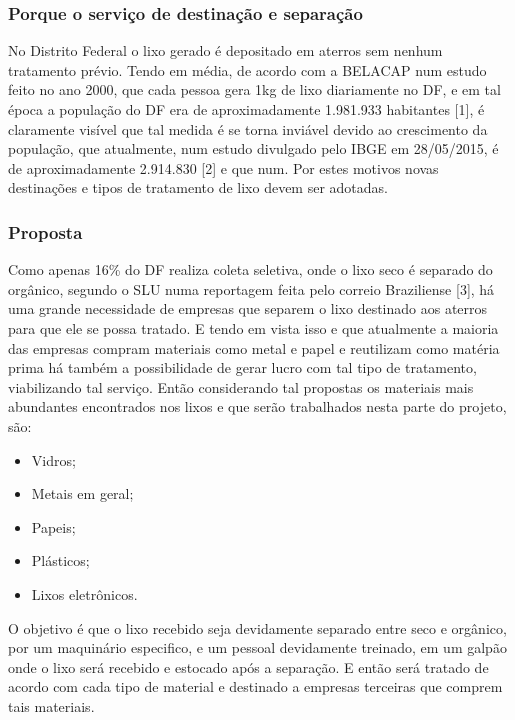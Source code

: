   \subsubsection{Porque o serviço de destinação e separação}

  No Distrito Federal o lixo gerado é depositado em aterros sem nenhum tratamento prévio. Tendo em média, de acordo com a BELACAP num estudo feito no ano 2000, que cada pessoa gera 1kg de lixo diariamente no DF, e em tal época a população do DF era de aproximadamente 1.981.933 habitantes [1], é claramente visível que tal medida é se torna inviável devido ao crescimento da população, que atualmente, num estudo divulgado pelo IBGE em 28/05/2015, é de aproximadamente 2.914.830 [2] e que num. Por estes motivos novas destinações e tipos de tratamento de lixo devem ser adotadas.

  \subsubsection{Proposta}

    Como apenas 16\% do DF realiza coleta seletiva, onde o lixo seco é separado do orgânico, segundo o SLU numa reportagem feita pelo correio Braziliense [3], há uma grande necessidade de empresas que separem o lixo destinado aos aterros para que ele se possa tratado. E tendo em vista isso e que atualmente a maioria das empresas compram materiais como metal e papel e reutilizam como matéria prima há também a possibilidade de gerar lucro com tal tipo de tratamento, viabilizando tal serviço. Então considerando tal propostas os materiais mais abundantes encontrados nos lixos e que serão trabalhados nesta parte do projeto, são:
    \begin{itemize}
      \item Vidros;
      \item Metais em geral;
      \item Papeis;
      \item Plásticos;
      \item Lixos eletrônicos.
    \end{itemize}

    O objetivo é que o lixo recebido seja devidamente separado entre seco e orgânico, por um maquinário especifico, e um pessoal devidamente treinado, em um galpão onde o lixo será recebido e estocado após a separação. E então será tratado de acordo com cada tipo de material e destinado a empresas terceiras que comprem tais materiais.

